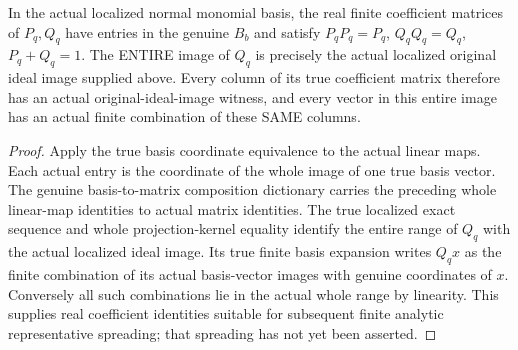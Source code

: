 \begin{theorem}
\label{hir:relative-normal-finite-jet-actual-idempotent-matrices}
\leanok
{}
In the actual localized normal monomial basis, the real finite coefficient
matrices of $P_q,Q_q$ have entries in the genuine $B_b$ and satisfy
$P_qP_q=P_q$, $Q_qQ_q=Q_q$, $P_q+Q_q=1$.
The ENTIRE image of $Q_q$ is precisely the actual localized original
ideal image supplied above. Every column of its true coefficient matrix
therefore has an actual original-ideal-image witness, and every vector
in this entire image has an actual finite combination of these SAME columns.
\end{theorem}
\begin{proof}
Apply the true basis coordinate equivalence to the actual linear maps.
Each actual entry is the coordinate of the whole image of one true basis
vector. The genuine basis-to-matrix composition dictionary carries the
preceding whole linear-map identities to actual matrix identities.
The true localized exact sequence and whole projection-kernel equality
identify the entire range of $Q_q$ with the actual localized ideal image.
Its true finite basis expansion writes $Q_qx$ as the finite combination
of its actual basis-vector images with genuine coordinates of $x$.
Conversely all such combinations lie in the actual whole range by linearity.
This supplies real coefficient identities suitable for subsequent finite
analytic representative spreading; that spreading has not yet been asserted.
\end{proof}

